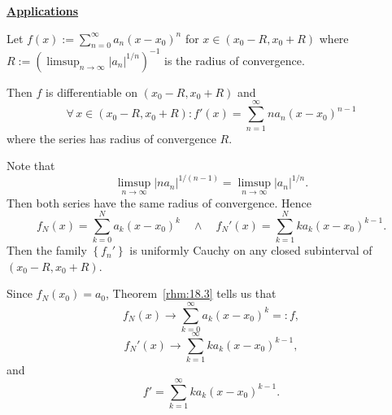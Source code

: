 \documentclass{notes}
\begin{document}
  {\boldmath \bfseries \underline{Applications}}

  \begin{lem}
    Let $f(x) := \sum_{n = 0}^\infty a_n (x - x_0)^n$ for $x \in (x_0 - R, x_0 + R)$ where $R := (\limsup_{n \to \infty} \left | a_n \right |^{1 / n})^{-1}$ is the radius of convergence.
    
    Then $f$ is differentiable on $(x_0 - R, x_0 + R)$ and 
    \[
      \forall \, x \in (x_0 - R, x_0 + R): f'(x) = \sum_{n = 1}^\infty n a_n (x - x_0)^{n - 1}
    \]
    where the series has radius of convergence $R$.
  \end{lem}
  
  \begin{prf}
    Note that 
    \[
      \limsup_{n \to \infty} \left | n a_n \right |^{1 / (n - 1)} = \limsup_{n \to \infty} \left | a_n \right |^{1 / n}.
    \]
    Then both series have the same radius of convergence.
    Hence 
    \[
      f_N(x) = \sum_{k = 0}^N a_k (x - x_0)^k \quad \land \quad f_N'(x) = \sum_{k = 1}^N k a_k (x - x_0)^{k - 1}.
    \]
    Then the family $\left \{ f_n' \right \}$ is uniformly Cauchy on any closed subinterval of $(x_0 - R, x_0 + R)$.
    
    Since $f_N(x_0) = a_0$, Theorem~\ref{rhm:18.3} tells us that 
    \[
      f_N(x) \to \sum_{k = 0}^\infty a_k (x - x_0)^k =: f, 
    \]
    \[
      f_N'(x) \to \sum_{k = 1}^\infty k a_k (x - x_0)^{k - 1}, 
    \]
    and 
    \[
      f' = \sum_{k = 1}^\infty k a_k (x - x_0)^{k - 1}.
    \]
  \end{prf}
\end{document}
